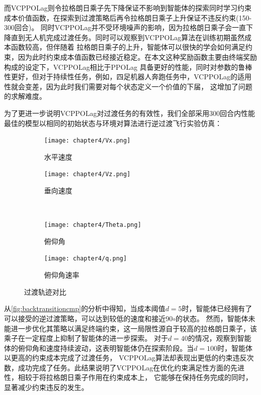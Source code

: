 而VCPPOLag则令拉格朗日乘子先下降保证不影响到智能体的探索同时学习约束成本价值函数，在探索到过渡策略后再令拉格朗日乘子上升保证不违反约束(150-300回合)。
同时VCPPOLag并不受环境噪声的影响，因为拉格朗日乘子会一直下降直到无人机完成过渡任务。同时可以观察到VCPPOLag算法在训练初期虽然成本函数较高，但伴随着
拉格朗日乘子的上升，智能体可以很快的学会如何满足约束，因为此时约束成本值函数已经接近稳定。在本文这种奖励函数主要由终端奖励构成的设定下，VCPPOLag相比于PPOLag
具备更好的性能，同时对参数的鲁棒性更好，但对于持续性任务，例如，四足机器人奔跑任务中，VCPPOLag的适用性就会变差，因为此时我们需要对每个状态定义一个价值的下届，
这增加了问题的求解难度。

为了更进一步说明VCPPOLag对过渡任务的有效性，我们全部采用300回合内性能最佳的模型以相同的初始状态与环境对算法进行逆过渡飞行实验仿真：
\begin{figure}[H]
    \centering
    \begin{subfigure}{.5\textwidth}
        \centering
        \texttt{[image: chapter4/Vx.png]}
        \caption{水平速度}
        \label{fig:vxcmp}
    \end{subfigure}%
    \hfill %
    \begin{subfigure}{.5\textwidth}
        \centering
        \texttt{[image: chapter4/Vz.png]}
        \caption{垂向速度}
        \label{fig:vzcmp}
    \end{subfigure}
    \\
    \begin{subfigure}{.5\textwidth}
        \centering
        \texttt{[image: chapter4/Theta.png]}
        \caption{俯仰角}
        \label{fig:vxcmp}
    \end{subfigure}%
    \hfill %
    \begin{subfigure}{.5\textwidth}
        \centering
        \texttt{[image: chapter4/q.png]}
        \caption{俯仰角速率}
        \label{fig:vzcmp}
    \end{subfigure}
    \caption{过渡轨迹对比}
    \label{fig:backtransitioncmp}
\end{figure}

从\autoref{fig:backtransitioncmp}的分析中得知，当成本阈值$d=5$时，智能体已经拥有了可以接受的逆过渡策略，可以达到较低的速度和接近90$\circ$的状态。
然而，智能体未能进一步优化其策略以满足终端约束，这一局限性源自于较高的拉格朗日乘子，该乘子在一定程度上抑制了智能体的进一步探索。
对于$d=40$的情况，观察到智能体的俯仰角和速度持续波动，这表明智能体仍在探索阶段。当$d=100$时，智能体以更高的约束成本完成了过渡任务，
VCPPOLag算法却表现出更低的约束违反次数，成功完成了任务。此结果说明了VCPPOLag在优化约束满足性方面的先进性，相较于将拉格朗日乘子作用在约束成本上，
它能够在保持任务完成的同时，显著减少约束违反的发生。
